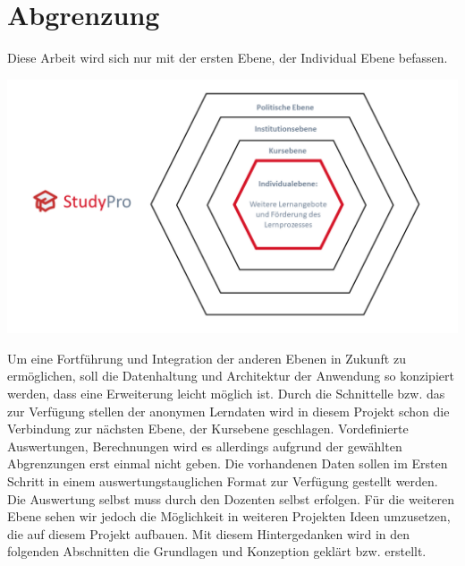 \section{Abgrenzung}
Diese Arbeit wird sich nur mit der ersten Ebene, der Individual Ebene befassen. 

\includegraphics[width=\linewidth,keepaspectratio]{img/Ebenen}

Um eine Fortführung und Integration der anderen Ebenen in Zukunft zu ermöglichen, soll die Datenhaltung und Architektur der Anwendung so konzipiert werden, dass eine Erweiterung leicht möglich ist. Durch die Schnittelle bzw. das zur Verfügung stellen der anonymen Lerndaten wird in diesem Projekt schon die Verbindung zur nächsten Ebene, der Kursebene geschlagen. Vordefinierte Auswertungen, Berechnungen wird es allerdings aufgrund der gewählten Abgrenzungen erst einmal nicht geben. Die vorhandenen Daten sollen im Ersten Schritt in einem auswertungstauglichen Format zur Verfügung gestellt werden. Die Auswertung selbst muss durch den Dozenten selbst erfolgen. Für die weiteren Ebene sehen wir jedoch die Möglichkeit in weiteren Projekten Ideen umzusetzen, die auf diesem Projekt aufbauen. Mit diesem Hintergedanken wird in den folgenden Abschnitten die Grundlagen und Konzeption geklärt bzw. erstellt. 